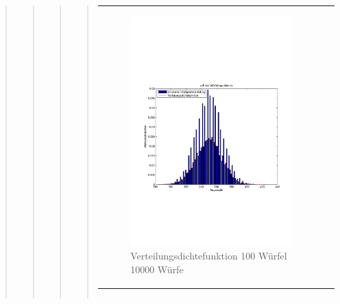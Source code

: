 \begin{quote}
\begin{quote}
\begin{quote}
\begin{quote}
\begin{center}
\begin{tabular}{ll}
\begin{minipage}{0.6\textwidth}
                     \begin{figure}[H]
                        \label{fig:}
                        \includegraphics[scale=0.3]{./Bilder/100wuerfelpdf} %
                        \caption{Verteilungsdichtefunktion 100 Würfel 10000 Würfe}
                    \end{figure}
               \vspace{-1.5em}

                \end{minipage}

            \end{tabular}
            \end{center}

            \begin{center}
            \begin{tabular}{ll}


\end{tabular}
\end{center}
\end{quote}
\end{quote}
\end{quote}
\end{quote}
